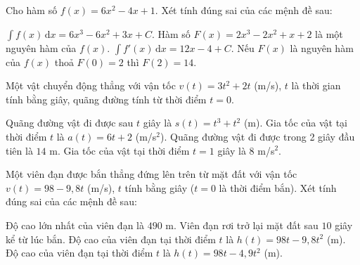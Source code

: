 \begin{bai}Cho hàm số $f(x)=6 x^{2} - 4 x + 1$. Xét tính đúng sai của các mệnh đề sau:
\begin{dungsai}
  \y $\int f(x)\,\mathrm dx=6 x^{3} - 6 x^{2} + 3 x+C$. \oDS
  \y Hàm số $F(x)=2 x^{3} - 2 x^{2} + x+2$ là một nguyên hàm của $f(x)$. \oDS
  \y $\int f'(x)\,\mathrm dx=12 x - 4+C$. \oDS
  \y Nếu $F(x)$ là nguyên hàm của $f(x)$ thoả $F(0)=2$ thì $F(2)=14$. \oDS
\end{dungsai}
\end{bai}
\begin{bai}Một vật chuyển động thẳng với vận tốc $v(t)=3 t^{2} + 2 t$ (m/s), $t$ là thời gian tính bằng giây, quãng đường tính từ thời điểm $t=0$.
\begin{dungsai}
  \y Quãng đường vật đi được sau $t$ giây là $s(t)=t^{3} + t^{2}$ (m). \oDS
  \y Gia tốc của vật tại thời điểm $t$ là $a(t)=6 t + 2$ (m/s$^2$). \oDS
  \y Quãng đường vật đi được trong 2 giây đầu tiên là $14$ m. \oDS
  \y Gia tốc của vật tại thời điểm $t=1$ giây là $8$ m/s$^2$. \oDS
\end{dungsai}
\end{bai}
\begin{bai}Một viên đạn được bắn thẳng đứng lên trên từ mặt đất với vận tốc $v(t)=98-9{,}8t$ (m/s), $t$ tính bằng giây ($t=0$ là thời điểm bắn). Xét tính đúng sai của các mệnh đề sau:

\begin{dungsai}
  \y Độ cao lớn nhất của viên đạn là $490$ m. \oDS
  \y Viên đạn rơi trở lại mặt đất sau $10$ giây kể từ lúc bắn. \oDS
  \y Độ cao của viên đạn tại thời điểm $t$ là $h(t)=98t-9{,}8t^2$ (m). \oDS
  \y Độ cao của viên đạn tại thời điểm $t$ là $h(t)=98t-4{,}9t^2$ (m). \oDS
\end{dungsai}
\end{bai}

